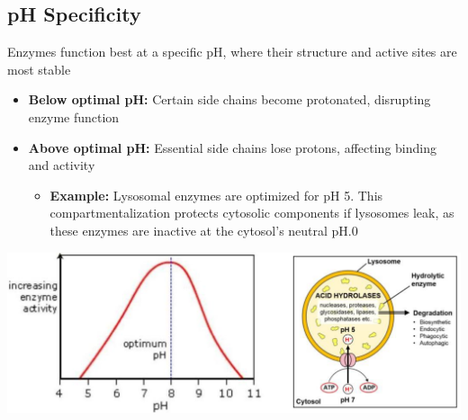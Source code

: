 \documentclass[10pt]{article}
\begin{document}
\subsection*{pH Specificity}
Enzymes function best at a specific pH, where their structure and active sites are most stable
\begin{itemize}
    \item \textbf{Below optimal pH:} Certain side chains become protonated, disrupting enzyme function
    \item \textbf{Above optimal pH:} Essential side chains lose protons, affecting binding and activity
    \begin{itemize}
        \item \textbf{Example:} Lysosomal enzymes are optimized for pH 5.  This compartmentalization protects cytosolic components if lysosomes leak, as these enzymes are inactive at the cytosol's neutral pH.0
    \end{itemize}
\end{itemize}
\begin{center}
    \includegraphics*[width=\textwidth]{L1_17.png}
\end{center}
\end{document}
